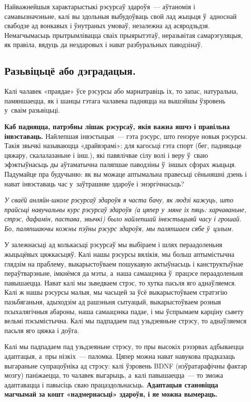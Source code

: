 Найважнейшыя характарыстыкі рэсурсаў здароўя~--- аўтаномія і самавызначэньне, калі вы здольныя выбудоўваць свой лад жыцьця ў~адноснай свабодзе ад вонкавых і ўнутраных умоваў, незалежна ад асяродзьдзя. Немагчымасьць прытрымлівацца сваіх прыярытэтаў, неразьвітая самарэгуляцыя, як правіла, вядуць да нездаровых і нават разбуральных паводзінаў.

\subsection*{Разьвіцьцё або дэградацыя.} 

Калі чалавек «праядае» ўсе рэсурсы або марнатравіць іх, то запас, натуральна, памяншаецца, як і шанцы гэтага чалавека падняцца на вышэйшы ўзровень у~сваім разьвіцьці. 

\textbf{Каб падняцца, патрэбны лішак рэсурсаў, якія важна яшчэ і правільна інвэставаць.} Найлепшая інвэстыцыя~--- гэта рэсурс, што генэруе новыя рэсурсы. Такія звычкі называюцца «драйвэрамі»: для кагосьці гэта спорт (бег, падняцьце цяжару, скалалазаньне і інш.), які павялічвае сілу волі і веру ў~сваю эфэктыўнасьць ды аўтаматычна паляпшае паводзіны ў~іншых сфэрах жыцьця. Падумайце пра будучыню: як вы можаце аптымальна правесьці сёньняшні дзень і нават інвэставаць час у~заўтрашняе здароўе і энэргічнасьць?

\emph{У сваёй анляйн-школе рэсурсаў здароўя я часта бачу, як людзі кажуць, што прайсьці навучальны курс рэсурсаў здароўя (а цяпер у~мяне іх пяць: харчаваньне, стрэс, дафамін, пастава, звычкі) было найлепшай інвэстыцыяй часу і грошай. Бо, паляпшаючы кожны пэўны рэсурс здароўя, мы паляпшаем сябе ў~цэлым.}

У залежнасьці ад колькасьці рэсурсаў мы выбіраем і шлях пераадоленьня жыцьцёвых цяжкасьцяў. Калі нашы рэсурсы вялікія, мы больш аптымістычна глядзім на праблему, выкарыстоўваем пошукавую актыўнасьць і канструктыўнае пераўтварэньне, імкнёмся да мэты, а~наша самаацэнка ў~працэсе пераадоленьня павышаецца. Нават калі мы зьведваем стрэс, то хутка пасьля яго аднаўляемся. Калі ж нашы рэсурсы малыя, мы часьцей за ўсё выкарыстоўваем стратэгію пазьбяганьня, адыходзім ад рашэньня сытуацый, выкарыстоўваем розныя псыхалягічныя абароны, наша самаацэнка падае, і мы ўспрымаем карціну сьвету вельмі пэсымістычна. Калі мы падпадаем пад узьдзеяньне стрэсу, то аднаўляемся пасьля яго цяжка і доўга.

Калі мы падпадаем пад узьдзеяньне стрэсу, то пры высокіх рэзэрвах адбываецца адаптацыя, а~пры нізкіх~--- паломка. Цяпер можна нават навукова прадказаць выгараньне супрацоўніка ад стрэсу: калі ўзровень BDNF (нэўратарафічны фактар мозгу) паніжаецца, то чалавек выгарыць, а~калі павышаецца~--- то зможа адаптавацца і павысіць сваю працаздольнасьць. \textbf{Адаптацыя становіцца магчымай за кошт «надмернасьці» здароўя, і яе можна вымераць.}


